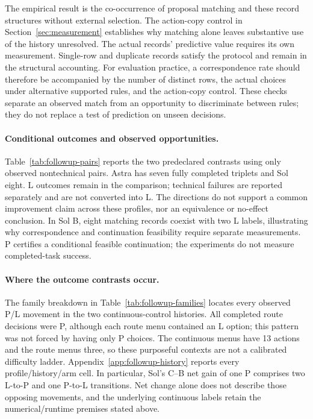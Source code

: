 

The empirical result is the co-occurrence of proposal matching and these
record structures without external selection. The action-copy control in
Section~\ref{sec:measurement} establishes why matching alone leaves
substantive use of the history unresolved. The actual records' predictive
value requires its own measurement. Single-row and duplicate records satisfy
the protocol and remain in the structural accounting. For evaluation practice, a correspondence rate should
therefore be accompanied by the number of distinct rows, the actual choices
under alternative supported rules, and the action-copy control. These checks
separate an observed match from an opportunity to discriminate between rules;
they do not replace a test of prediction on unseen decisions.

\paragraph{Conditional outcomes and observed opportunities.}
Table~\ref{tab:followup-pairs} reports the two predeclared contrasts using only
observed nontechnical pairs. Astra has seven fully completed triplets and Sol
eight. L outcomes remain in the comparison; technical failures are reported
separately and are not converted into L. The directions do not support a
common improvement claim across these profiles, nor an equivalence or
no-effect conclusion. In Sol B, eight matching records coexist with two L
labels, illustrating why correspondence and continuation feasibility require
separate measurements. P certifies a conditional feasible continuation;
the experiments do not measure completed-task success.



\paragraph{Where the outcome contrasts occur.}
The family breakdown in Table~\ref{tab:followup-families} locates every
observed P/L movement in the two continuous-control histories. All completed
route decisions were P, although each route menu contained an L option;
this pattern was not forced by having only P choices. The continuous menus
have 13 actions and the route menus three, so these purposeful contexts are
not a calibrated difficulty ladder. Appendix~\ref{app:followup-history}
reports every profile/history/arm cell. In particular, Sol's C--B net gain
of one P comprises two L-to-P and one P-to-L transitions. Net change alone
does not describe those opposing movements, and the underlying continuous
labels retain the numerical/runtime premises stated above.

